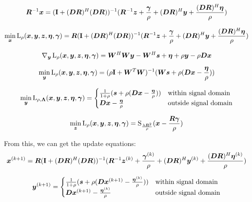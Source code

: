 \documentclass{article}
\begin{document}
\begin{equation}
\bm{R}^{-1}\bm{x} = ({\bf I} + (\bm{D}\bm{R})^H(\bm{D}\bm{R}))^{-1}(\bm{R}^{-1}\bm{z} + \frac{\bm{\gamma}}{\rho} + (\bm{D}\bm{R})^H\bm{y} + \frac{(\bm{D}\bm{R})^H\bm{\eta}}{\rho})
\end{equation}

\begin{equation}
\min_{\bm{x}} \operatorname{L}_{\rho}(\bm{x},\bm{y},\bm{z},\bm{\eta},\bm{\gamma}) = \bm{R}({\bf I} + (\bm{D}\bm{R})^H(\bm{D}\bm{R}))^{-1}(\bm{R}^{-1}\bm{z} + \frac{\bm{\gamma}}{\rho} + (\bm{D}\bm{R})^H\bm{y} + \frac{(\bm{D}\bm{R})^H\bm{\eta}}{\rho})
\end{equation}

\begin{equation}
\nabla_{\bm{y}}\operatorname{L}_{\rho}(\bm{x},\bm{y},\bm{z},\bm{\eta},\bm{\gamma}) = \bm{W}^H\bm{W}\bm{y} - \bm{W}^H\bm{s} + \bm{\eta} + \rho\bm{y} - \rho\bm{D}\bm{x}
\end{equation}

\begin{equation}
\min_{\bm{y}} \operatorname{L}_{\rho}(\bm{x},\bm{y},\bm{z},\bm{\eta},\bm{\gamma}) = (\rho{\bf I} + \bm{W}^T\bm{W})^{-1}(\bm{W}\bm{s} + \rho(\bm{D}\bm{x} - \frac{\bm{\eta}}{\rho}))
\end{equation}

\begin{equation}
\min_{\bm{y}} \operatorname{L}_{\rho,\bm{\Lambda}}(\bm{x},\bm{y},\bm{z},\bm{\eta},\bm{\gamma}) = \begin{cases}
\frac{1}{1 + \rho}(\bm{s} + \rho(\bm{D}\bm{x} - \frac{\bm{\eta}}{\rho})) & \text{within signal domain}\\
\bm{D}\bm{x} - \frac{\bm{\eta}}{\rho} & \text{outside signal domain}
\end{cases}
\end{equation}

\begin{equation}
\min_{\bm{z}} \operatorname{L}_{\rho}(\bm{x},\bm{y},\bm{z},\bm{\eta},\bm{\gamma}) = \operatorname{S}_{\frac{\lambda\bm{R}^2}{\rho}}(\bm{x} - \frac{\bm{R}\bm{\gamma}}{\rho})
\end{equation}

From this, we can get the update equations:
\begin{equation}
\bm{x}^{(k + 1)} = \bm{R}({\bf I} + (\bm{D}\bm{R})^H(\bm{D}\bm{R}))^{-1}(\bm{R}^{-1}\bm{z}^{(k)} + \frac{\bm{\gamma}^{(k)}}{\rho} + (\bm{D}\bm{R})^H\bm{y}^{(k)} + \frac{(\bm{D}\bm{R})^H\bm{\eta}^{(k)}}{\rho})
\end{equation}

\begin{equation}
\bm{y}^{(k + 1)}= \begin{cases}
\frac{1}{1 + \rho}(\bm{s} + \rho(\bm{D}\bm{x}^{(k + 1)} - \frac{\bm{\eta}^{(k)}}{\rho})) & \text{within signal domain}\\
\bm{D}\bm{x}^{(k + 1)} - \frac{\bm{\eta}^{(k)}}{\rho} & \text{outside signal domain}
\end{cases}
\end{equation}
\end{document}
